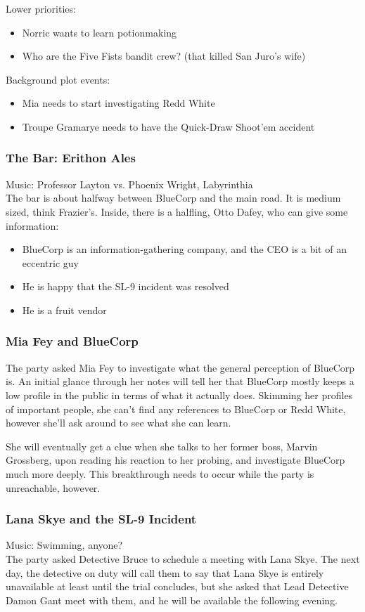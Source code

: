 Lower priorities:
\begin{itemize}
\item Norric wants to learn potionmaking
\item Who are the Five Fists bandit crew? (that killed San Juro's wife)
\end{itemize}

Background plot events:
\begin{itemize}
\item Mia needs to start investigating Redd White
\item Troupe Gramarye needs to have the Quick-Draw Shoot'em accident
\end{itemize}

\subsubsection{The Bar: Erithon Ales}
Music: Professor Layton vs. Phoenix Wright, Labyrinthia\\
The bar is about halfway between BlueCorp and the main road. It is medium sized, think Frazier's. Inside, there is a halfling, Otto Dafey, who can give some information:
\begin{itemize}
\item BlueCorp is an information-gathering company, and the CEO is a bit of an eccentric guy
\item He is happy that the SL-9 incident was resolved
\item He is a fruit vendor
\end{itemize}

\subsubsection{Mia Fey and BlueCorp}
The party asked Mia Fey to investigate what the general perception of BlueCorp is. An initial glance through her notes will tell her that BlueCorp mostly keeps a low profile in the public in terms of what it actually does. Skimming her profiles of important people, she can't find any references to BlueCorp or Redd White, however she'll ask around to see what she can learn.

She will eventually get a clue when she talks to her former boss, Marvin Grossberg, upon reading his reaction to her probing, and investigate BlueCorp much more deeply. This breakthrough needs to occur while the party is unreachable, however.

\subsubsection{Lana Skye and the SL-9 Incident}
Music: Swimming, anyone?\\
The party asked Detective Bruce to schedule a meeting with Lana Skye. The next day, the detective on duty will call them to say that Lana Skye is entirely unavailable at least until the trial concludes, but she asked that Lead Detective Damon Gant meet with them, and he will be available the following evening. 

